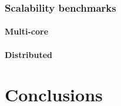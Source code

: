 	\subsection{Scalability benchmarks}
		\subsubsection{Multi-core}
		\subsubsection{Distributed}

\chapter{Conclusions}

  \printbibliography[heading=bibintoc] %



